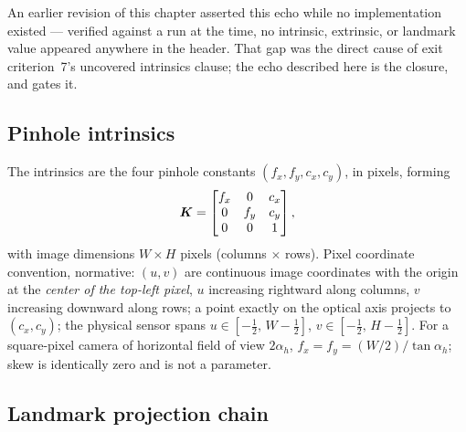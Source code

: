 An earlier revision of this chapter asserted this echo while no
implementation existed --- verified against a run at the time, no
intrinsic, extrinsic, or landmark value appeared anywhere in the header.
That gap was the direct cause of exit criterion~7's uncovered intrinsics
clause; the echo described here is the closure, and
 gates it.

\subsection{Pinhole intrinsics}
\label{sec:camera:intrinsics}

The intrinsics are the four pinhole constants $(f_x, f_y, c_x, c_y)$, in
pixels, forming
\begin{equation}
  \bm{K} =
  \begin{bmatrix}
    f_x & 0 & c_x \\
    0 & f_y & c_y \\
    0 & 0 & 1
  \end{bmatrix},
  \label{eq:camera:K}
\end{equation}
with image dimensions $W \times H$ pixels (columns $\times$ rows). Pixel
coordinate convention, normative: $(u, v)$ are continuous image
coordinates with the origin at the \emph{center of the top-left pixel},
$u$ increasing rightward along columns, $v$ increasing downward along
rows; a point exactly on the optical axis projects to $(c_x, c_y)$; the
physical sensor spans $u \in [-\tfrac12,\, W - \tfrac12]$, $v \in
[-\tfrac12,\, H - \tfrac12]$. For a square-pixel camera of horizontal
field of view $2\alpha_h$, $f_x = f_y = (W/2)/\tan\alpha_h$; skew is
identically zero and is not a parameter.

\subsection{Landmark projection chain}
\label{sec:camera:projection}


